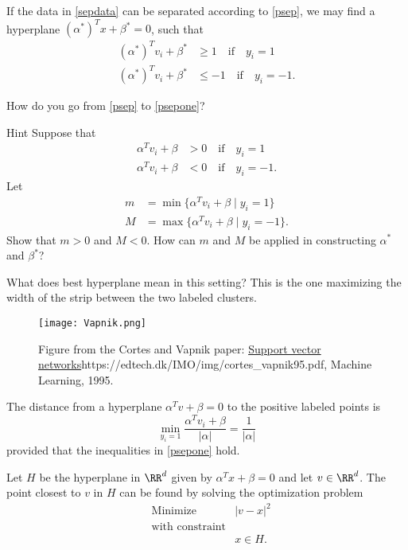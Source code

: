 \documentclass{article}
\begin{document}
  If the data in \eqref{sepdata} can be separated according to
  \eqref{psep}, we may find a hyperplane $(\alpha^*)^T x + \beta^* = 0$,
  such that
  \begin{align}\label{psepone}
    (\alpha^*)^T v_i + \beta^* &\geq 1\quad\text{if}\quad y_i = 1\\
    (\alpha^*)^T v_i + \beta^* &\leq -1\quad\text{if}\quad y_i = -1.
  \end{align}

  \beginshex
  How do you go from \eqref{psep} to \eqref{psepone}?

  \begin{hideinbutton}{Hint}
    Suppose that 
\begin{align*}
    \alpha^T v_i + \beta &> 0\quad\text{if}\quad y_i = 1\\
    \alpha^T v_i + \beta &< 0\quad\text{if}\quad y_i = -1.
\end{align*}
Let
\begin{align*}
    m &= \min\{\alpha^T v_i + \beta \mid y_i = 1\}\\
    M &= \max\{\alpha^T v_i + \beta \mid y_i = -1\}.
\end{align*}
Show that $m > 0$ and $M < 0$. How can $m$ and $M$ be applied in
constructing $\alpha^*$ and $\beta^*$?
  \end{hideinbutton}

  \endshex
  
  What does best hyperplane mean in this setting? This is the one maximizing the width of the
  strip between the two labeled clusters.

  \begin{figure}
    \texttt{[image: Vapnik.png]}
    \caption{Figure from the Cortes and Vapnik paper: \url{Support vector networks}{https://edtech.dk/IMO/img/cortes_vapnik95.pdf}, Machine Learning, 1995.}
  \end{figure}
  
  The distance from a hyperplane $\alpha^T v + \beta = 0$ to the positive labeled points is
  $$
  \min_{y_i = 1} \frac{\alpha^T v_i + \beta}{|\alpha|} = \frac{1}{|\alpha|}
  $$
  provided that the inequalities in \eqref{psepone} hold.

\beginshex
Let $H$ be the hyperplane in $\RR^d$ given by $\alpha^T x + \beta = 0$ and let $v\in \RR^d$.
The point closest to $v$ in $H$ can be found by solving the optimization problem
  \begin{align}\label{LagrH}
    &\text{Minimize} &|v - x|^2\\
    &\text{with constraint}\\
    &&x\in H.
  \end{align}
\end{document}
